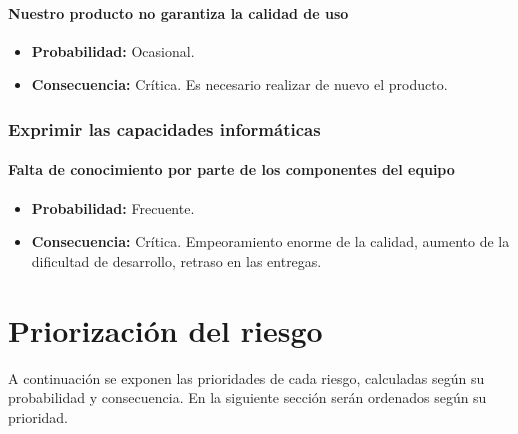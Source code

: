 \documentclass[spanish,a4paper,11pt, twoside]{report}	%
\begin{document}
	\subsection*{Nuestro producto no garantiza la calidad de uso}	
		\begin{itemize}
			\item \textbf {Probabilidad: }Ocasional.
			\item \textbf {Consecuencia: }Crítica. Es necesario realizar de nuevo el producto.
		\end{itemize}
		


%
\section{Exprimir las capacidades informáticas}

	\subsection*{Falta de conocimiento por parte de los componentes del equipo}	
		\begin{itemize}
			\item \textbf {Probabilidad: }Frecuente.
			\item \textbf {Consecuencia: }Crítica. Empeoramiento enorme de la calidad, aumento de la dificultad de desarrollo, retraso en las entregas.
		\end{itemize}
	



\newpage
\mbox{}
\thispagestyle{empty}						%
\newpage

\part{Priorización del riesgo}

%
\setcounter{section}{0}
A continuación se exponen las prioridades de cada riesgo, calculadas según su probabilidad y consecuencia. En la siguiente
sección serán ordenados según su prioridad.
\end{document}
